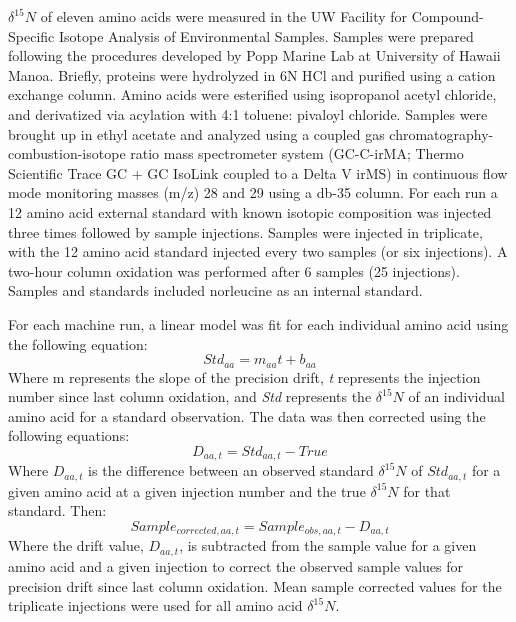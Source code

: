 \documentclass [11pt, proquest] {uwthesis}[2015/03/03]
\begin{document}
\(\delta^{15}N\) of eleven amino acids were measured in the UW Facility for Compound-Specific Isotope Analysis of Environmental Samples. Samples were prepared following the procedures developed by Popp Marine Lab at University of Hawaii Manoa. Briefly, proteins were hydrolyzed in 6N HCl and purified using a cation exchange column. Amino acids were esterified using isopropanol acetyl chloride, and derivatized via acylation with 4:1 toluene: pivaloyl chloride. Samples were brought up in ethyl acetate and analyzed using a coupled gas chromatography-combustion-isotope ratio mass spectrometer system (GC-C-irMA; Thermo Scientific Trace GC + GC IsoLink coupled to a Delta V irMS) in continuous flow mode monitoring masses (m/z) 28 and 29 using a db-35 column. For each run a 12 amino acid external standard with known isotopic composition was injected three times followed by sample injections. Samples were injected in triplicate, with the 12 amino acid standard injected every two samples (or six injections). A two-hour column oxidation was performed after 6 samples (25 injections). Samples and standards included norleucine as an internal standard.

For each machine run, a linear model was fit for each individual amino acid using the following equation:
\begin{equation} 
  Std_{aa} = m_{aa}t + b_{aa}
  \label{eq:std}
\end{equation}
Where m represents the slope of the precision drift, \emph{t} represents the injection number since last column oxidation, and \emph{Std} represents the \(\delta^{15}N\) of an individual amino acid for a standard observation. The data was then corrected using the following equations:
\begin{equation} 
  D_{aa, t} = Std_{aa,t} - True
  \label{eq:diff}
\end{equation}
Where \(D_{aa,t}\) is the difference between an observed standard \(\delta^{15}N\) of \(Std_{aa,t}\) for a given amino acid at a given injection number and the true \(\delta^{15}N\) for that standard. Then:
\begin{equation} 
  Sample_{corrected,aa,t} = Sample_{obs,aa,t} - D_{aa,t}
  \label{eq:sampcorr}
\end{equation}
Where the drift value, \(D_{aa,t}\), is subtracted from the sample value for a given amino acid and a given injection to correct the observed sample values for precision drift since last column oxidation. Mean sample corrected values for the triplicate injections were used for all amino acid \(\delta^{15}N\).
\end{document}
